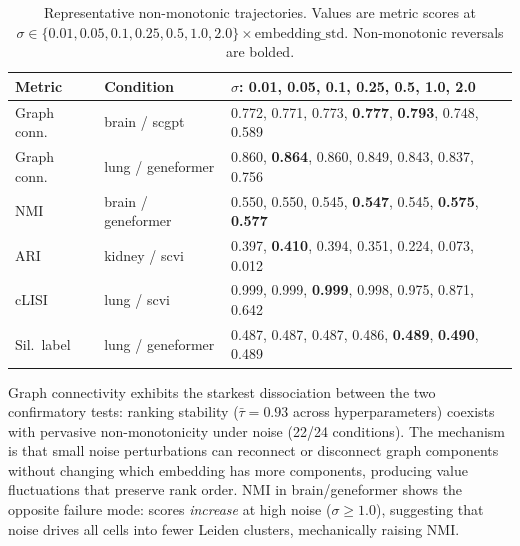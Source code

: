 \documentclass[9pt,lineno]{elife}
\begin{document}
\begin{table}[h!]
\centering
\caption{Representative non-monotonic trajectories. Values are metric scores at $\sigma \in \{0.01, 0.05, 0.1, 0.25, 0.5, 1.0, 2.0\} \times \text{embedding\_std}$. Non-monotonic reversals are bolded.}
\label{tab:app_noise_fail}
\footnotesize
\begin{tabular}{@{}llp{}@{}}
\toprule
Metric & Condition & $\sigma$: 0.01, 0.05, 0.1, 0.25, 0.5, 1.0, 2.0 \\
\midrule
Graph conn. & brain / scgpt & 0.772, 0.771, 0.773, \textbf{0.777}, \textbf{0.793}, 0.748, 0.589 \\
Graph conn. & lung / geneformer & 0.860, \textbf{0.864}, 0.860, 0.849, 0.843, 0.837, 0.756 \\
NMI & brain / geneformer & 0.550, 0.550, 0.545, \textbf{0.547}, 0.545, \textbf{0.575}, \textbf{0.577} \\
ARI & kidney / scvi & 0.397, \textbf{0.410}, 0.394, 0.351, 0.224, 0.073, 0.012 \\
cLISI & lung / scvi & 0.999, 0.999, \textbf{0.999}, 0.998, 0.975, 0.871, 0.642 \\
Sil.\ label & lung / geneformer & 0.487, 0.487, 0.487, 0.486, \textbf{0.489}, \textbf{0.490}, 0.489 \\
\bottomrule
\end{tabular}
\end{table}

Graph connectivity exhibits the starkest dissociation between the two confirmatory tests: ranking stability ($\bar{\tau} = 0.93$ across hyperparameters) coexists with pervasive non-monotonicity under noise (22/24 conditions). The mechanism is that small noise perturbations can reconnect or disconnect graph components without changing which embedding has more components, producing value fluctuations that preserve rank order. NMI in brain/geneformer shows the opposite failure mode: scores \emph{increase} at high noise ($\sigma \geq 1.0$), suggesting that noise drives all cells into fewer Leiden clusters, mechanically raising NMI.
\end{document}
